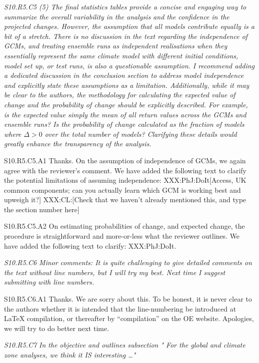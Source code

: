 \documentclass[a4paper,10pt]{article}
\begin{document}
	\emph{S10.R5.C5 (5) The final statistics tables provide a concise and engaging way to summarize the overall variability in the analysis and the confidence in the projected changes. However, the assumption that all models contribute equally is a bit of a stretch. There is no discussion in the text regarding the independence of GCMs, and treating ensemble runs as independent realisations when they essentially represent the same climate model with different initial conditions, model set up, or test runs, is also a questionable assumption. I recommend adding a dedicated discussion in the conclusion section to address model independence and explicitly state these assumptions as a limitation. Additionally, while it may be clear to the authors, the methodology for calculating the expected value of change and the probability of change should be explicitly described. For example, is the expected value simply the mean of all return values across the GCMs and ensemble runs? Is the probability of change calculated as the fraction of models where $\Delta > 0$ over the total number of models? Clarifying these details would greatly enhance the transparency of the analysis.}

	S10.R5.C5.A1 Thanks. On the assumption of independence of GCMs, we again agree with the reviewer's comment. We have added the following text to clarify the potential limitations of assuming independence: XXX:PhJ:DoIt[Access, UK common components; can you actually learn which GCM is working best and upweigh it?] XXX:CL:[Check that we haven't already mentioned this, and type the section number here]

	S10.R5.C5.A2 On estimating probabilities of change, and expected change, the procedure is straightforward and more-or-less what the reviewer outlines. We have added the following text to clarify: XXX:PhJ:DoIt.

	
	\emph{S10.R5.C6 Minor comments: It is quite challenging to give detailed comments on the text without line numbers, but I will try my best. Next time I suggest submitting with line numbers.}
	
	S10.R5.C6.A1 Thanks. We are sorry about this. To be honest, it is never clear to the authors whether it is intended that the line-numbering be introduced at LaTeX compilation, or thereafter by ``compilation'' on the OE website. Apologies, we will try to do better next time.


	\emph{S10.R5.C7 In the objective and outlines subsection " For the global and climate zone analyses, we think it IS interesting …"}
		
\end{document}
